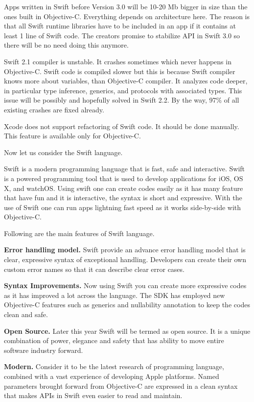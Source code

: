 Apps written in Swift before Version 3.0 will be 10-20 Mb bigger in size than
the ones built in Objective-C. Everything depends on architecture here.
The reason is that all Swift runtime libraries have to be included in an app if it
contains at least 1 line of Swift code. The creators promise to stabilize API in
Swift 3.0 so there will be no need doing this anymore.

Swift 2.1 compiler is unstable. It crashes sometimes which never happens
in Objective-C. Swift code is compiled slower but this is because Swift compiler
knows more about variables, than Objective-C compiler. It analyzes code deeper,
in particular type inference, generics, and protocols with associated types.
This issue will be possibly and hopefully solved in Swift 2.2. By the way,
97\% of all existing crashes are fixed already.

Xcode does not support refactoring of Swift code. It should be done manually.
This feature is available only for Objective-C.

Now let us consider the Swift language.

Swift is a modern programming language that is fast, safe and interactive.
Swift is a powered programming tool that is used to develop applications for iOS,
OS X, and watchOS. Using swift one can create codes easily as it has many feature
that have fun and it is interactive, the syntax is short and expressive.
With the use of Swift one can run apps lightning fast speed as it works
side-by-side with Objective-C.

Following are the main features of Swift language.

\textbf{Error handling model.}
Swift provide an advance error handling model that is clear, expressive syntax
of exceptional handling. Developers can create their own custom error names
so that it can describe clear error cases.

\textbf{Syntax Improvements.}
Now using Swift you can create more expressive codes as it has improved
a lot across the language. The SDK has employed new Objective-C features such as
generics and nullability annotation to keep the codes clean and safe.

\textbf{Open Source.}
Later this year Swift will be termed as open source. It is a unique combination
of power, elegance and safety that has ability to move entire software
industry forward.

\textbf{Modern.}
Consider it to be the latest research of programming language, combined with
a vast experience of developing Apple platforms. Named parameters brought
forward from Objective-C are expressed in a clean syntax that makes APIs
in Swift even easier to read and maintain.

